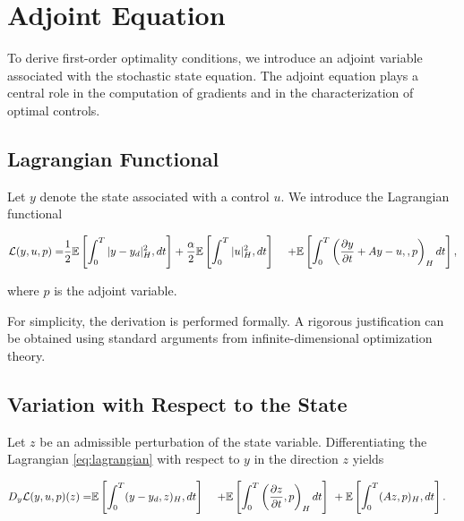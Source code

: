 \section{Adjoint Equation}

To derive first-order optimality conditions, we introduce an adjoint variable associated with 
the stochastic state equation. The adjoint equation plays a central role in the computation of 
gradients and in the characterization of optimal controls.

\subsection{Lagrangian Functional}

Let \(y\) denote the state associated with a control \(u\). We introduce the Lagrangian functional

\begin{equation}
\begin{aligned}
\mathcal L(y,u,p)
=
&
\frac{1}{2}
\mathbb{E}
\left[
\int_0^T
|y-y_d|_H^2
,dt
\right]
+
\frac{\alpha}{2}
\mathbb{E}
\left[
\int_0^T
|u|_H^2
,dt
\right]
\
&
+
\mathbb{E}
\left[
\int_0^T
\left(
\frac{\partial y}{\partial t}
+
Ay
-
u,
, p
\right)_H
dt
\right],
\end{aligned}
\label{eq:lagrangian}
\end{equation}

where \(p\) is the adjoint variable.

For simplicity, the derivation is performed formally. A rigorous justification can be obtained 
using standard arguments from infinite-dimensional optimization theory.

\subsection{Variation with Respect to the State}

Let \(z\) be an admissible perturbation of the state variable. Differentiating the Lagrangian 
\eqref{eq:lagrangian} with respect to \(y\) in the direction \(z\) yields

\begin{equation}
\begin{aligned}
D_y\mathcal L(y,u,p)(z)
=
&
\mathbb{E}
\left[
\int_0^T
(y-y_d,z)_H
,dt
\right]
\
&
+
\mathbb{E}
\left[
\int_0^T
\left(
\frac{\partial z}{\partial t},
p
\right)_H
dt
\right]
\
&
+
\mathbb{E}
\left[
\int_0^T
(Az,p)_H
,dt
\right].
\end{aligned}
\label{eq:variation_y}
\end{equation}

